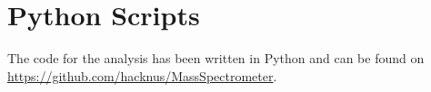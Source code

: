 \section{Python Scripts}
\label{app:python}
    The code for the analysis has been written in Python and can be found on \url{https://github.com/hacknus/MassSpectrometer}.
    
  
